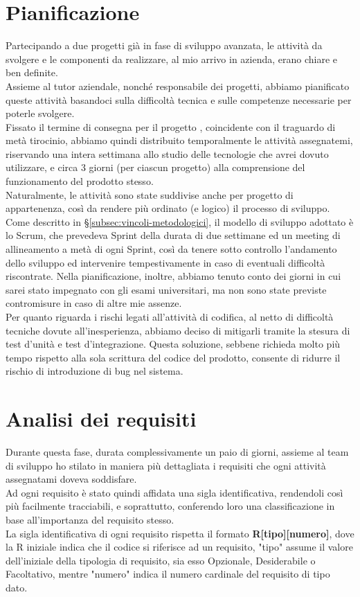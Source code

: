 \section{Pianificazione}
Partecipando a due progetti già in fase di sviluppo avanzata, le attività da svolgere e le componenti da realizzare, al mio arrivo in azienda, erano chiare e ben definite. \\
Assieme al tutor aziendale, nonché responsabile dei progetti, abbiamo pianificato queste attività basandoci sulla difficoltà tecnica e sulle competenze necessarie per poterle svolgere.\\
Fissato il termine di consegna per il progetto \DS{}, coincidente con il traguardo di metà tirocinio, abbiamo quindi distribuito temporalmente le attività assegnatemi, riservando una intera settimana allo studio delle tecnologie che avrei dovuto utilizzare, e circa 3 giorni (per ciascun progetto) alla comprensione del funzionamento del prodotto stesso.\\
Naturalmente, le attività sono state suddivise anche per progetto di appartenenza, così da rendere più ordinato (e logico) il processo di sviluppo.\\
Come descritto in §\ref{subsec:vincoli-metodologici}, il modello di sviluppo adottato è lo Scrum, che prevedeva Sprint della durata di due settimane ed un meeting di allineamento a metà di ogni Sprint, così da tenere sotto controllo l'andamento dello sviluppo ed intervenire tempestivamente in caso di eventuali difficoltà riscontrate.
Nella pianificazione, inoltre, abbiamo tenuto conto dei giorni in cui sarei stato impegnato con gli esami universitari, ma non sono state previste contromisure in caso di altre mie assenze.\\
Per quanto riguarda i rischi legati all'attività di codifica, al netto di difficoltà tecniche dovute all'inesperienza, abbiamo deciso di mitigarli tramite la stesura di test d'unità e test d'integrazione. Questa soluzione, sebbene richieda molto più tempo rispetto alla sola scrittura del codice del prodotto, consente di ridurre il rischio di introduzione di bug nel sistema.
\section{Analisi dei requisiti}
Durante questa fase, durata complessivamente un paio di giorni, assieme al team di sviluppo ho stilato in maniera più dettagliata i requisiti che ogni attività assegnatami doveva soddisfare.\\
Ad ogni requisito è stato quindi affidata una sigla identificativa, rendendoli così più facilmente tracciabili, e soprattutto, conferendo loro una classificazione in base all'importanza del requisito stesso.\\
La sigla identificativa di ogni requisito rispetta il formato \textbf{R[tipo][numero]}, dove la R iniziale indica che il codice si riferisce ad un requisito, "tipo" assume il valore dell'iniziale della tipologia di requisito, sia esso Opzionale, Desiderabile o Facoltativo, mentre "numero" indica il numero cardinale del requisito di tipo dato.

